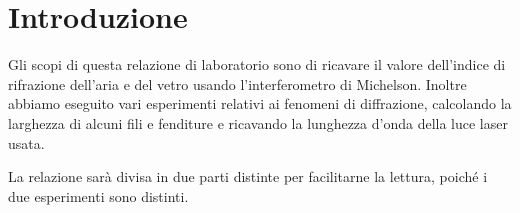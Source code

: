 \section{Introduzione}

Gli scopi di questa relazione di laboratorio sono di ricavare il valore dell'indice di rifrazione dell'aria e del vetro usando
l'interferometro di Michelson. Inoltre abbiamo eseguito vari esperimenti relativi ai fenomeni di diffrazione, calcolando la larghezza
di alcuni fili e fenditure e ricavando la lunghezza d'onda della luce laser usata.

La relazione sarà divisa in due parti distinte per facilitarne la lettura, poiché i due esperimenti sono distinti.



